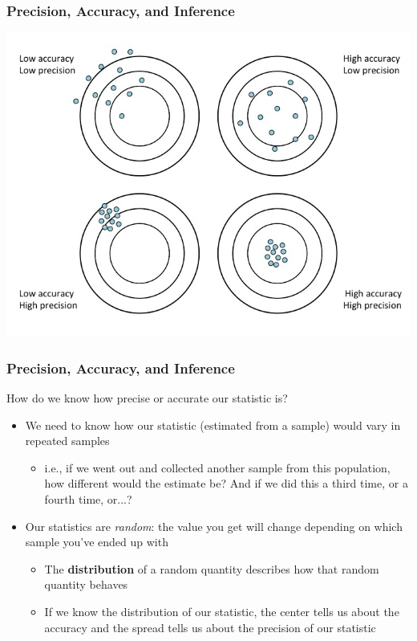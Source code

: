 \documentclass[12pt, 
hyperref={colorlinks=true, linkcolor=blue, urlcolor=cyan}]{beamer}
\begin{document}
\begin{frame}
\frametitle{Precision, Accuracy, and Inference}
\includegraphics[width=\textwidth]{./accuracy} %
\end{frame}

\begin{frame}
\frametitle{Precision, Accuracy, and Inference}
How do we know how precise or accurate our statistic is?
\begin{itemize}
\item We need to know how our statistic (estimated from a sample) would vary in repeated samples
	\begin{itemize}
	\item i.e., if we went out and collected another sample from this population, how different would the estimate be? And if we did this a third time, or a fourth time, or...?
	\end{itemize}
\item Our statistics are \textit{random}: the value you get will change depending on which sample you've ended up with
	\begin{itemize}
	\item The \textbf{distribution} of a random quantity describes how that random quantity behaves
	\item If we know the distribution of our statistic, the center tells us about the accuracy and the spread tells us about the precision of our statistic
	\end{itemize}
\end{itemize}

\end{frame}
\end{document}
